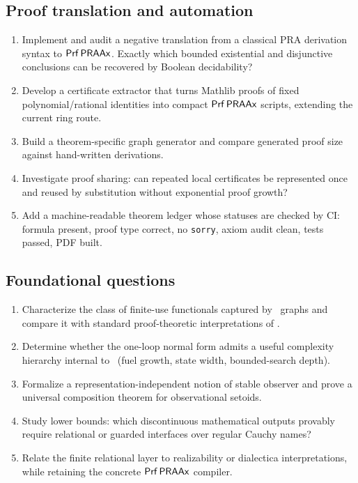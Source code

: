 \subsection{Proof translation and automation}

\begin{enumerate}[label=\textbf{R\arabic*.},resume]
  \item Implement and audit a negative translation from a classical PRA derivation syntax to \(\mathsf{Prf}\,\mathsf{PRAAx}\).  Exactly which bounded existential and disjunctive conclusions can be recovered by Boolean decidability?
  \item Develop a certificate extractor that turns Mathlib proofs of fixed polynomial/rational identities into compact \(\mathsf{Prf}\,\mathsf{PRAAx}\) scripts, extending the current ring route.
  \item Build a theorem-specific graph generator and compare generated proof size against hand-written derivations.
  \item Investigate proof sharing: can repeated local certificates be represented once and reused by substitution without exponential proof growth?
  \item Add a machine-readable theorem ledger whose statuses are checked by CI: formula present, proof type correct, no \texttt{sorry}, axiom audit clean, tests passed, PDF built.
\end{enumerate}

\subsection{Foundational questions}

\begin{enumerate}[label=\textbf{R\arabic*.},resume]
  \item Characterize the class of finite-use functionals captured by \KIFCR\ graphs and compare it with standard proof-theoretic interpretations of \iPRA.
  \item Determine whether the one-loop normal form admits a useful complexity hierarchy internal to \iPRA\ (fuel growth, state width, bounded-search depth).
  \item Formalize a representation-independent notion of stable observer and prove a universal composition theorem for observational setoids.
  \item Study lower bounds: which discontinuous mathematical outputs provably require relational or guarded interfaces over regular Cauchy names?
  \item Relate the finite relational layer to realizability or dialectica interpretations, while retaining the concrete \(\mathsf{Prf}\,\mathsf{PRAAx}\) compiler.
\end{enumerate}

